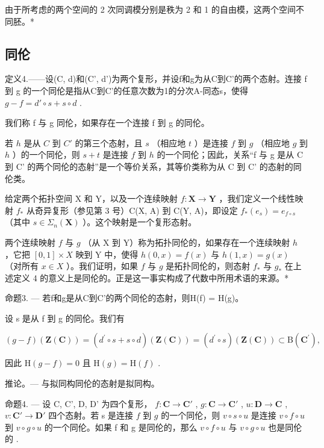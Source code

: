 由于所考虑的两个空间的 2 次同调模分别是秩为 2 和 1 的自由模，这两个空间不同胚。*

\subsection{同伦}

定义4.——设(C, d)和(C', d')为两个复形，并设f和g为从C到C'的两个态射。连接 f 到 g 的一个同伦是指从C到C'的任意次数为1的分次A-同态s，使得 \(g - f = d' \circ s + s \circ d\) .

我们称 f 与 g 同伦，如果存在一个连接 f 到 g 的同伦。

若 \(h\) 是从 \(C\) 到 \(C'\) 的第三个态射，且 \(s\) （相应地 \(t\) ）是连接 \(f\) 到 \(g\) （相应地 \(g\) 到 \(h\) ）的一个同伦，则 \(s + t\) 是连接 \(f\) 到 \(h\) 的一个同伦；因此，关系“f 与 g 是从 C 到 C' 的两个同伦的态射”是一个等价关系，其等价类称为从 C 到 C' 的态射的同伦类。

给定两个拓扑空间 X 和 Y，以及一个连续映射 \(f: \mathbf{X} \to \mathbf{Y}\) ，我们定义一个线性映射 \(f_{*}\) 从奇异复形（参见第 3 号）C(X, A) 到 C(Y, A)，即设定 \(f_{*}(e_{s}) = e_{f \circ s}\) （其中 \(s \in \Sigma_{n}(\mathbf{X})\) ）。这个映射是一个复形态射。

两个连续映射 \(f\) 与 \(g\) （从 X 到 Y）称为拓扑同伦的，如果存在一个连续映射 \(h\) ，它把 \([0, 1] \times X\) 映到 Y 中，使得 \(h(0, x) = f(x)\) 与 \(h(1, x) = g(x)\) （对所有 \(x \in X\) ）。我们证明，如果 \(f\) 与 \(g\) 是拓扑同伦的，则态射 \(f_*\) 与 \(g_*\) 在上述定义 4 的意义上是同伦的。正是这一事实构成了代数中所用术语的来源。*

命题3. --- 若f和g是从C到C'的两个同伦的态射，则H(f) = H(g)。

设 s 是从 f 到 g 的同伦。我们有

\[
(g - f) (\mathbf {Z} (\mathbf {C})) = (d ^ {\prime} \circ s + s \circ d) (\mathbf {Z} (\mathbf {C})) = (d ^ {\prime} \circ s) (\mathbf {Z} (\mathbf {C})) \subset \mathrm{B} (\mathbf {C} ^ {\prime}),
\]

因此 \(\mathrm{H}(g - f) = 0\) 且 \(\mathrm{H}(g) = \mathrm{H}(f)\) .

推论。--- 与拟同构同伦的态射是拟同构。

命题4. --- 设 C, C', D, D' 为四个复形， \(f: \mathbf{C} \to \mathbf{C}'\) , \(g: \mathbf{C} \to \mathbf{C}'\) , \(u: \mathbf{D} \to \mathbf{C}\) , \(v: \mathbf{C}' \to \mathbf{D}'\) 四个态射。若 s 是连接 \(f\) 到 \(g\) 的一个同伦，则 \(v \circ s \circ u\) 是连接 \(v \circ f \circ u\) 到 \(v \circ g \circ u\) 的一个同伦。如果 f 和 g 是同伦的，那么 \(v \circ f \circ u\) 与 \(v \circ g \circ u\) 也是同伦的 .


